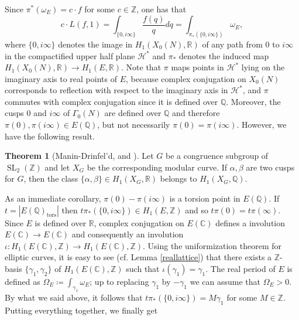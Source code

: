 \documentclass[11pt]{amsart}
\theoremstyle{definition}
\newtheorem{thm}[definizione]{Theorem}
\begin{document}
  		
  		
  		
  		
  		
 		
		Since $\pi^*(\omega_E)=c\cdot f$ for some $c\in {\mathbb{Z}}$, one has that
			\begin{equation}\label{Lvalue2}
				c\cdot L(f,1)=\int_{\{0,i\infty\}}\frac{f(q)}{q}dq=\int_{\pi_*(\{0,i\infty\})}\omega_E,
		\end{equation}
		where $\{0,i\infty\}$ denotes the image in $H_1(X_0(N),{\mathbb{R}})$ of any path from $0$ to $i\infty$ in the compactified upper half plane ${\mathcal{H}}^*$ and $\pi_*$ denotes the 
		induced map $H_1(X_0(N),{\mathbb{R}})\to H_1(E,{\mathbb{R}})$.
		Note that $\pi$ maps points in ${\mathcal{H}}^*$ lying on the imaginary axis to real points of $E$, because complex 
		conjugation on $X_0(N)$ corresponds to reflection with respect to the imaginary axis in ${\mathcal{H}}^*$, and $\pi$ commutes with 
		complex conjugation since it is defined over ${\mathbb{Q}}$. Moreover, the cusps $0$ and $i\infty$ of $\Gamma_0(N)$ are defined over ${\mathbb{Q}}$ and therefore $\pi(0),\pi(i\infty)\in 
		E({\mathbb{Q}})$, but not necessarily $\pi(0)=\pi(i\infty)$. However, we have the following result.
			\begin{thm}[Manin-Drinfel'd, \cite{man1} and \cite{drin}]\label{mandri}
				Let $G$ be a congruence subgroup of $\operatorname{SL}_2({\mathbb{Z}})$ and let $X_G$ be the corresponding modular curve. If $\alpha,\beta$ are 
				two cusps for $G$, then the class $\{\alpha,\beta\}\in H_1(X_G,{\mathbb{R}})$ belongs to $H_1(X_G,{\mathbb{Q}})$.
		\end{thm}
		As an immediate corollary, $\pi(0)-\pi(i\infty)$ is a torsion point in $E({\mathbb{Q}})$. If $t=|E({\mathbb{Q}})_{\text{tors}}|$ then $t\pi_*(\{0,i\infty\})\in H_1(E,{\mathbb{Z}})$ and so
		$t\pi(0)=t\pi(\infty)$. 		
		Since $E$ is defined over ${\mathbb{R}}$, complex conjugation on $E({\mathbb{C}})$ defines a involution $E({\mathbb{C}})\to E({\mathbb{C}})$ and consequently 
		an involution $\iota\colon H_1(E({\mathbb{C}}),{\mathbb{Z}})\to H_1(E({\mathbb{C}}),{\mathbb{Z}})$. Using the uniformization theorem for elliptic curves, it is easy to see (cf. Lemma \ref{reallattice}) that there exists a ${\mathbb{Z}}$-basis $\{\gamma_1,\gamma_2\}$ of $H_1(E({\mathbb{C}}),{\mathbb{Z}})$ such that $\iota(\gamma_1)=\gamma_1$. The real period of $E$ is defined as $\Omega_E\coloneqq \int_{\gamma_1}\omega_E$; up to 
		replacing $\gamma_1$ by $-\gamma_1$ we can assume that $\Omega_E>0$. By what we said above, it follows that $t\pi_*(\{0,i\infty\})=M\gamma_1$ for some $M\in {\mathbb{Z}}$. Putting everything together, we finally get
\end{document}
